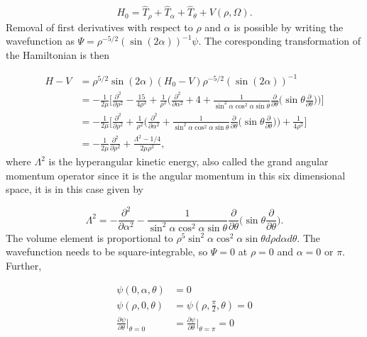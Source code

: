 \documentclass{article}
\begin{document}
\begin{equation}
H_0 = \hat{T}_{\rho} + \hat{T}_{\alpha} + \hat{T}_{\theta} + V(\rho,\Omega).
\end{equation}                      		
Removal of first derivatives with respect to $\rho$ and $\alpha$ is possible by writing the wavefunction as $\Psi = \rho^{-5/2}(\sin(2\alpha))^{-1}\psi$. The coresponding transformation of the Hamiltonian is then


\begin{align}
	H-V &= \rho^{5/2}\sin(2\alpha) (H_0-V) \rho^{-5/2}(\sin(2\alpha))^{-1}\nonumber\\
	    &= -\frac{1}{2\mu} \bigg[ \frac{\partial^2}{\partial\rho^2} - \frac{15}{4\rho^2} + \frac{1}{\rho^2}\bigg( \frac{\partial^2}{\partial\alpha^2} + 4 + \frac{1}{\sin^2\alpha\cos^2\alpha\sin\theta} \frac{\partial}{\partial\theta} \bigg( \sin\theta \frac{\partial}{\partial\theta} \bigg) \bigg) \bigg]\nonumber\\
	    &= -\frac{1}{2\mu} \bigg[ \frac{\partial^2}{\partial\rho^2} + \frac{1}{\rho^2}\bigg( \frac{\partial^2}{\partial\alpha^2} + \frac{1}{\sin^2\alpha\cos^2\alpha\sin\theta} \frac{\partial}{\partial\theta} \bigg( \sin\theta \frac{\partial}{\partial\theta} \bigg) \bigg) + \frac{1}{4\rho^2} \bigg]\nonumber\\
	    &= -\frac{1}{2\mu}\frac{\partial^2}{\partial\rho^2} + \frac{\Lambda^2 - 1/4}{2\mu\rho^2},
\end{align}   
where $\Lambda^2$ is the hyperangular kinetic energy, also called the grand angular momentum operator since it is the angular momentum in this six dimensional space, it is in this case given by 

\begin{equation}
\Lambda^2 = -\frac{\partial^2}{\partial\alpha^2} - \frac{1}{\sin^2\alpha\cos^2\alpha\sin\theta} \frac{\partial}{\partial\theta} \bigg( \sin\theta \frac{\partial}{\partial\theta}\bigg).
\end{equation}
The volume element is proportional to $\rho^5\sin^2\alpha\cos^2\alpha\sin\theta d\rho d\alpha d\theta$. 
The wavefunction needs to be square-integrable, so $\Psi = 0$ at $\rho=0$ and $\alpha = 0 $ or $\pi$. Further, 

\begin{subequations}
\begin{align*}
	\psi(0,\alpha,\theta) &= 0\\
	\psi(\rho,0,\theta)    &= \psi(\rho,\frac{\pi}{2},\theta) = 0\\
	\frac{\partial\psi}{\partial\theta}\bigg\rvert_{\theta = 0} &= \frac{\partial\psi}{\partial\theta}\bigg\rvert_{\theta = \pi} = 0
\end{align*}   
\end{subequations} 
\end{document}
